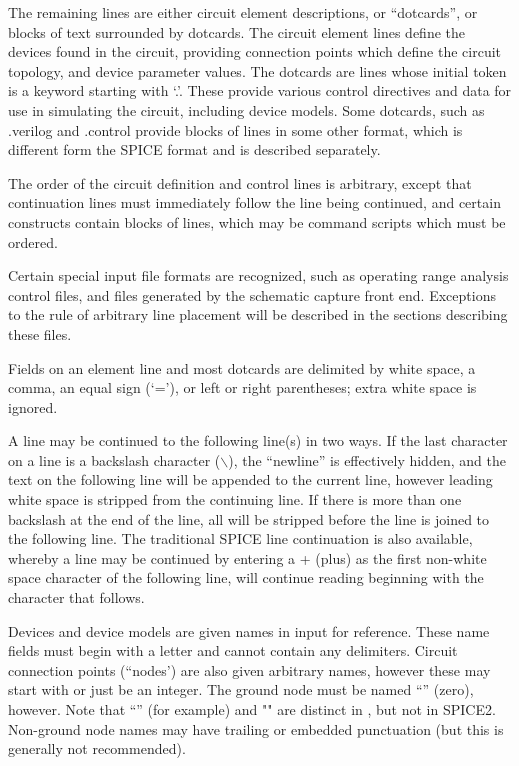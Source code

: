 The remaining lines are either circuit element descriptions, or
``dotcards'', or blocks of text surrounded by dotcards.  The circuit
element lines define the devices found in the circuit, providing
connection points which define the circuit topology, and device
parameter values.  The dotcards are lines whose initial token is a
keyword starting with `.'.  These provide various control directives
and data for use in simulating the circuit, including device models. 
Some dotcards, such as {\vt .verilog} and {\vt .control} provide
blocks of lines in some other format, which is different form the
SPICE format and is described separately.

The order of the circuit definition and control lines is arbitrary,
except that continuation lines must immediately follow the line being
continued, and certain constructs contain blocks of lines, which may
be command scripts which must be ordered.

Certain special input file formats are recognized, such as operating
range analysis control files, and files generated by the {\Xic}
schematic capture front end.  Exceptions to the rule of arbitrary line
placement will be described in the sections describing these files.

Fields on an element line and most dotcards are delimited by white
space, a comma, an equal sign (`='), or left or right parentheses;
extra white space is ignored.

A line may be continued to the following line(s) in two ways.  If the
last character on a line is a backslash character ($\backslash$), the
``newline'' is effectively hidden, and the text on the following line
will be appended to the current line, however leading white space is
stripped from the continuing line.  If there is more than one
backslash at the end of the line, all will be stripped before the line
is joined to the following line.  The traditional SPICE line
continuation is also available, whereby a line may be continued by
entering a {\vt +} (plus) as the first non-white space character of
the following line, {\WRspice} will continue reading beginning with
the character that follows.

Devices and device models are given names in input for reference. 
These name fields must begin with a letter and cannot contain any
delimiters.  Circuit connection points (``nodes') are also given
arbitrary names, however these may start with or just be an integer. 
The ground node must be named ``{}'' (zero), however.  Note that
``{}'' (for example) and "{}" are distinct in
{\WRspice}, but not in SPICE2.  Non-ground node names may have
trailing or embedded punctuation (but this is generally not
recommended).


